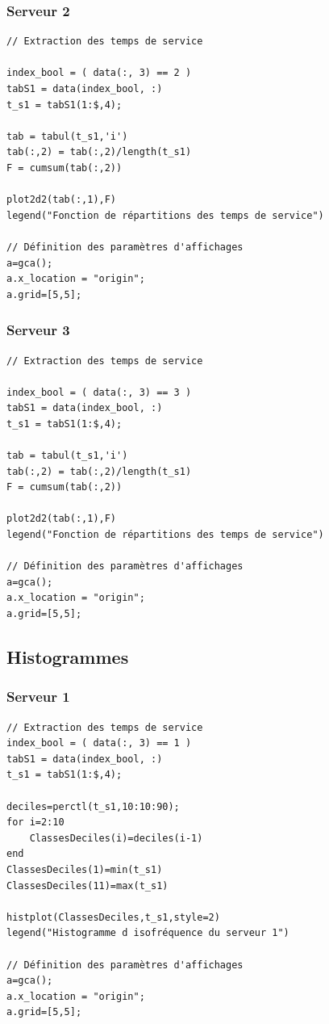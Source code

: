 \documentclass{article}
\begin{document}
\subsubsection{Serveur 2}
\begin{verbatim}
// Extraction des temps de service

index_bool = ( data(:, 3) == 2 )
tabS1 = data(index_bool, :)
t_s1 = tabS1(1:$,4);

tab = tabul(t_s1,'i')
tab(:,2) = tab(:,2)/length(t_s1)
F = cumsum(tab(:,2))

plot2d2(tab(:,1),F)
legend("Fonction de répartitions des temps de service")

// Définition des paramètres d'affichages
a=gca();
a.x_location = "origin";
a.grid=[5,5];
\end{verbatim}

\subsubsection{Serveur 3}
\begin{verbatim}
// Extraction des temps de service

index_bool = ( data(:, 3) == 3 )
tabS1 = data(index_bool, :)
t_s1 = tabS1(1:$,4);

tab = tabul(t_s1,'i')
tab(:,2) = tab(:,2)/length(t_s1)
F = cumsum(tab(:,2))

plot2d2(tab(:,1),F)
legend("Fonction de répartitions des temps de service")

// Définition des paramètres d'affichages
a=gca();
a.x_location = "origin";
a.grid=[5,5];
\end{verbatim}

\subsection{Histogrammes}

\subsubsection{Serveur 1}
\begin{verbatim}
// Extraction des temps de service
index_bool = ( data(:, 3) == 1 )
tabS1 = data(index_bool, :)
t_s1 = tabS1(1:$,4);

deciles=perctl(t_s1,10:10:90);
for i=2:10
    ClassesDeciles(i)=deciles(i-1)
end
ClassesDeciles(1)=min(t_s1)
ClassesDeciles(11)=max(t_s1)

histplot(ClassesDeciles,t_s1,style=2)
legend("Histogramme d isofréquence du serveur 1")

// Définition des paramètres d'affichages
a=gca();
a.x_location = "origin";
a.grid=[5,5];
\end{verbatim}
\end{document}
